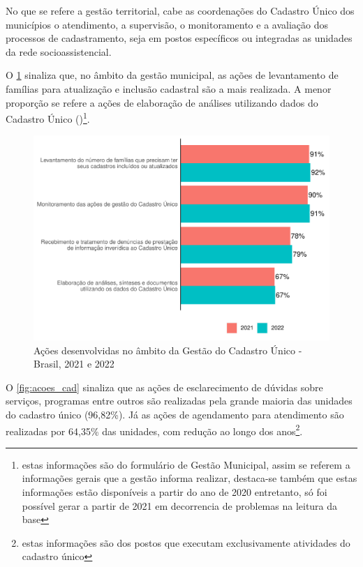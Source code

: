 \documentclass[
  brazilian]{report}
\begin{document}
No que se refere a gestão territorial, cabe as coordenações do Cadastro
Único dos municípios o atendimento, a supervisão, o monitoramento e a
avaliação dos processos de cadastramento, seja em postos específicos ou
integradas as unidades da rede socioassistencial.

O \cref{fig:gestao_cad} sinaliza que, no âmbito da gestão municipal, as
ações de levantamento de famílias para atualização e inclusão cadastral
são a mais realizada. A menor proporção se refere a ações de elaboração
de análises utilizando dados do Cadastro Único
()\footnote{estas informações são do formulário de Gestão Municipal, assim se referem a informações gerais que a gestão informa realizar, destaca-se também que estas informações estão disponíveis a partir do ano de 2020 entretanto, só foi possível gerar a partir de 2021 em decorrencia de problemas na leitura da base}.

\begin{figure}
\includegraphics{Censo-SUAS-2022_files/figure-latex/gestao_cad-1} \caption[Ações desenvolvidas no âmbito da Gestão do Cadastro Único - Brasil, 2021 e 2022]{Ações desenvolvidas no âmbito da Gestão do Cadastro Único - Brasil, 2021 e 2022}\label{fig:gestao_cad}
\end{figure}

O \cref{fig:acoes_cad} sinaliza que as ações de esclarecimento de
dúvidas sobre serviços, programas entre outros são realizadas pela
grande maioria das unidades do cadastro único (96,82\%). Já as ações de
agendamento para atendimento são realizadas por 64,35\% das unidades,
com redução ao longo dos
anos\footnote{estas informações são dos postos que executam exclusivamente atividades do cadastro único}.
\end{document}
